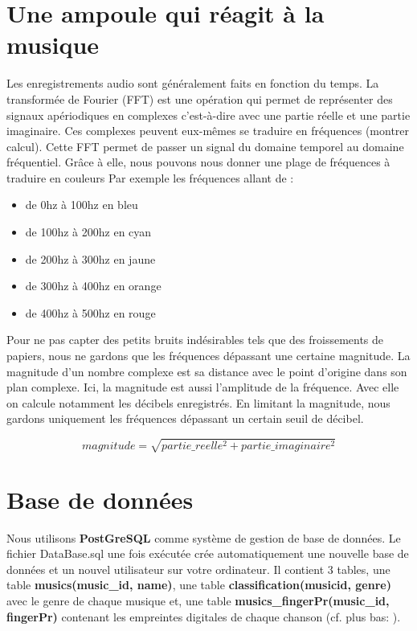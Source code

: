 \documentclass{article}
\begin{document}
\section{Une ampoule qui réagit à la musique}

Les enregistrements audio sont généralement faits en fonction du temps.
La transformée de Fourier (FFT) est une opération qui permet de représenter
des signaux apériodiques en complexes c'est-à-dire avec une partie réelle
et une partie imaginaire. Ces complexes peuvent eux-mêmes se traduire en fréquences
(montrer calcul). Cette FFT permet de passer un signal du domaine temporel au domaine fréquentiel.
Grâce à elle, nous pouvons nous donner une plage de fréquences à traduire en couleurs
Par exemple les fréquences allant de :
\begin{itemize}
  \item de 0hz à 100hz en bleu
  \item de 100hz à 200hz en cyan
  \item de 200hz à 300hz en jaune
  \item de 300hz à 400hz en orange
  \item de 400hz à 500hz en rouge
\end{itemize}

Pour ne pas capter des petits bruits indésirables tels que des froissements de papiers,
nous ne gardons que les fréquences dépassant une certaine magnitude.
La magnitude d’un nombre complexe est sa distance avec le point d’origine dans son plan complexe.
Ici, la magnitude est aussi l’amplitude de la fréquence.
Avec elle on calcule notamment les décibels enregistrés. En limitant la magnitude,
nous gardons uniquement les fréquences dépassant un certain seuil de décibel.

$$
magnitude = \sqrt{partie\_reelle^2 + partie\_imaginaire^2}
$$

\section{Base de données }

Nous utilisons {\bf PostGreSQL} comme système de gestion de base de données.
Le fichier DataBase.sql une fois exécutée crée automatiquement une nouvelle
base de données et un nouvel utilisateur sur votre ordinateur.
Il contient 3 tables, une table {\bf musics(music\_id, name)}, une table {\bf classification(musicid, genre)}
avec le genre de chaque musique et, une table {\bf  musics\_fingerPr(music\_id, fingerPr)}
contenant les empreintes digitales de chaque chanson (cf. plus bas: ).
\end{document}
